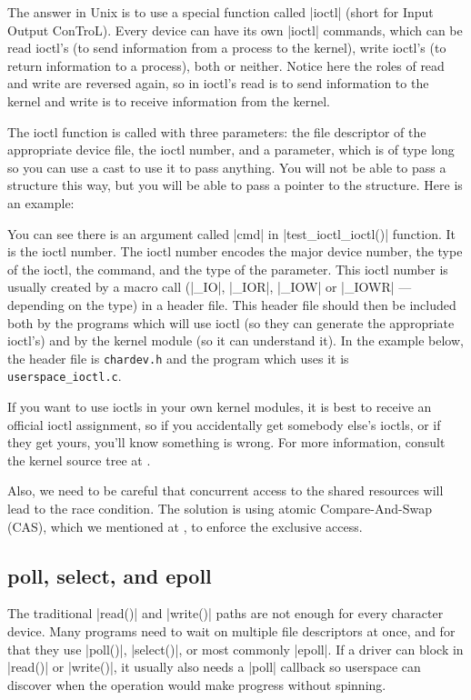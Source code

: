 \documentclass[10pt, oneside]{book}
\begin{document}
The answer in Unix is to use a special function called \cpp|ioctl| (short for Input Output ConTroL).
Every device can have its own \cpp|ioctl| commands, which can be read ioctl's (to send information from a process to the kernel), write ioctl's (to return information to a process), both or neither.
Notice here the roles of read and write are reversed again, so in ioctl's read is to send information to the kernel and write is to receive information from the kernel.

The ioctl function is called with three parameters: the file descriptor of the appropriate device file, the ioctl number, and a parameter, which is of type long so you can use a cast to use it to pass anything.
You will not be able to pass a structure this way, but you will be able to pass a pointer to the structure.
Here is an example:


You can see there is an argument called \cpp|cmd| in \cpp|test_ioctl_ioctl()| function.
It is the ioctl number.
The ioctl number encodes the major device number, the type of the ioctl, the command, and the type of the parameter.
This ioctl number is usually created by a macro call (\cpp|_IO|, \cpp|_IOR|, \cpp|_IOW| or \cpp|_IOWR| --- depending on the type) in a header file.
This header file should then be included both by the programs which will use ioctl (so they can generate the appropriate ioctl's) and by the kernel module (so it can understand it).
In the example below, the header file is \verb|chardev.h| and the program which uses it is \verb|userspace_ioctl.c|.

If you want to use ioctls in your own kernel modules, it is best to receive an official ioctl assignment, so if you accidentally get somebody else's ioctls, or if they get yours, you'll know something is wrong.
For more information, consult the kernel source tree at .

Also, we need to be careful that concurrent access to the shared resources will lead to the race condition.
The solution is using atomic Compare-And-Swap (CAS), which we mentioned at , to enforce the exclusive access.




\subsection{poll, select, and epoll}
\label{sec:poll_select_epoll}
The traditional \cpp|read()| and \cpp|write()| paths are not enough for every
character device.
Many programs need to wait on multiple file descriptors at once, and for that
they use \cpp|poll()|, \cpp|select()|, or most commonly \cpp|epoll|.
If a driver can block in \cpp|read()| or \cpp|write()|, it usually also needs a
\cpp|poll| callback so userspace can discover when the operation would make
progress without spinning.
\end{document}
